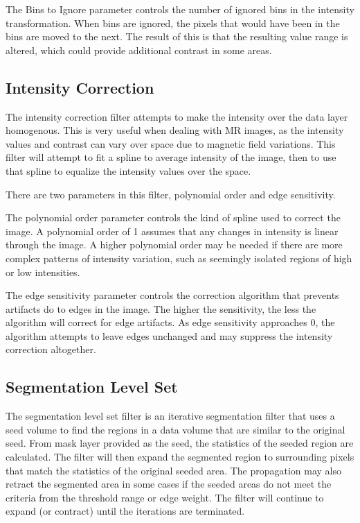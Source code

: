 \documentclass[fleqn,11pt,openany]{book}
\begin{document}
The Bins to Ignore parameter controls the number of ignored bins in the intensity transformation. When bins are ignored, the pixels that would have been in the bins are moved to the next.  The result of this is that the resulting value range is altered, which could provide additional contrast in some areas.  

\subsection{Intensity Correction}

The intensity correction filter attempts to make the intensity over the data layer homogenous.  This is very useful when dealing with MR images, as the intensity values and contrast can vary over space due to magnetic field variations.  This filter will attempt to fit a spline to average intensity of the image, then to use that spline to equalize the intensity values over the space.  

There are two parameters in this filter, polynomial order and edge sensitivity.  

The polynomial order parameter controls the kind of spline used to correct the image.  A polynomial order of 1 assumes that any changes in intensity is linear through the image.  A higher polynomial order may be needed if there are more complex patterns of intensity variation, such as seemingly isolated regions of high or low intensities.  

The edge sensitivity parameter controls the correction algorithm that prevents artifacts do to edges in the image.  The higher the sensitivity, the less the algorithm will correct for edge artifacts.  As edge sensitivity approaches 0, the algorithm attempts to leave edges unchanged and may suppress the intensity correction altogether.  

\subsection{Segmentation Level Set}

The segmentation level set filter is an iterative segmentation filter that uses a seed volume to find the regions in a data volume that are similar to the original seed.  From mask layer provided as the seed, the statistics of the seeded region are calculated.  The filter will then expand the segmented region to surrounding pixels that match the statistics of the original seeded area.  The propagation may also retract the segmented area in some cases if the seeded areas do not meet the criteria from the threshold range or edge weight.  The filter will continue to expand (or contract) until the iterations are terminated.  
\end{document}
